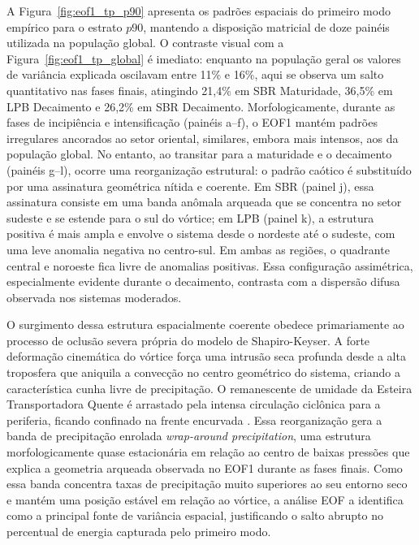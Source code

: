 A Figura~\ref{fig:eof1_tp_p90} apresenta os padrões espaciais do primeiro modo empírico para o estrato $p90$, mantendo a disposição matricial de doze painéis utilizada na população global.
O contraste visual com a Figura~\ref{fig:eof1_tp_global} é imediato: enquanto na população geral os valores de variância explicada oscilavam entre 11\% e 16\%, aqui se observa um salto quantitativo nas fases finais, atingindo 21,4\% em SBR Maturidade, 36,5\% em LPB Decaimento e 26,2\% em SBR Decaimento.
Morfologicamente, durante as fases de incipiência e intensificação (painéis a--f), o EOF1 mantém padrões irregulares ancorados ao setor oriental, similares, embora mais intensos, aos da população global.
No entanto, ao transitar para a maturidade e o decaimento (painéis g--l), ocorre uma reorganização estrutural: o padrão caótico é substituído por uma assinatura geométrica nítida e coerente.
Em SBR (painel j), essa assinatura consiste em uma banda anômala arqueada que se concentra no setor sudeste e se estende para o sul do vórtice; em LPB (painel k), a estrutura positiva é mais ampla e envolve o sistema desde o nordeste até o sudeste, com uma leve anomalia negativa no centro-sul.
Em ambas as regiões, o quadrante central e noroeste fica livre de anomalias positivas.
Essa configuração assimétrica, especialmente evidente durante o decaimento, contrasta com a dispersão difusa observada nos sistemas moderados.

O surgimento dessa estrutura espacialmente coerente obedece primariamente ao processo de oclusão severa própria do modelo de Shapiro-Keyser.
A forte deformação cinemática do vórtice força uma intrusão seca profunda desde a alta troposfera que aniquila a convecção no centro geométrico do sistema, criando a característica cunha livre de precipitação.
O remanescente de umidade da Esteira Transportadora Quente é arrastado pela intensa circulação ciclônica para a periferia, ficando confinado na frente encurvada \citep{shapiro1990life, schultz2021antecedents}.
Essa reorganização gera a banda de precipitação enrolada \textit{wrap-around precipitation}, uma estrutura morfologicamente quase estacionária em relação ao centro de baixas pressões que explica a geometria arqueada observada no EOF1 durante as fases finais.
Como essa banda concentra taxas de precipitação muito superiores ao seu entorno seco e mantém uma posição estável em relação ao vórtice, a análise EOF a identifica como a principal fonte de variância espacial, justificando o salto abrupto no percentual de energia capturada pelo primeiro modo.

